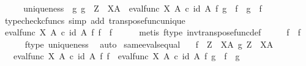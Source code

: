 \begin{isabellebody}
\ \ \isamarkupfalse%
\ \isamarkupfalse%
\ uniqueness{\isacharcolon}{\kern0pt}\ {\isachardoublequoteopen}{\isasymforall}\ g{\isachardot}{\kern0pt}\ g\ {\isacharcolon}{\kern0pt}\ Z\ {\isasymrightarrow}\ X\isactrlbsup A\isactrlesup \ {\isasymlongrightarrow}\ eval{\isacharunderscore}{\kern0pt}func\ X\ A\ {\isasymcirc}\isactrlsub c\ {\isacharparenleft}{\kern0pt}id\ A\ {\isasymtimes}\isactrlsub f\ g{\isacharparenright}{\kern0pt}\ {\isacharequal}{\kern0pt}\ f\isactrlsup {\isasymflat}\ {\isasymlongrightarrow}\ g\ {\isacharequal}{\kern0pt}\ {\isacharparenleft}{\kern0pt}f\isactrlsup {\isasymflat}{\isacharparenright}{\kern0pt}\isactrlsup {\isasymsharp}{\isachardoublequoteclose}\isanewline
\ \ \ \ \isamarkupfalse%
\ {\isacharparenleft}{\kern0pt}typecheck{\isacharunderscore}{\kern0pt}cfuncs{\isacharcomma}{\kern0pt}\ simp\ add{\isacharcolon}{\kern0pt}\ transpose{\isacharunderscore}{\kern0pt}func{\isacharunderscore}{\kern0pt}unique{\isacharparenright}{\kern0pt}\isanewline
\ \ \isamarkupfalse%
\ {\isachardoublequoteopen}eval{\isacharunderscore}{\kern0pt}func\ X\ A\ {\isasymcirc}\isactrlsub c\ {\isacharparenleft}{\kern0pt}id\ A\ {\isasymtimes}\isactrlsub f\ f{\isacharparenright}{\kern0pt}\ {\isacharequal}{\kern0pt}\ f\isactrlsup {\isasymflat}{\isachardoublequoteclose}\isanewline
\ \ \ \ \isamarkupfalse%
\ {\isacharparenleft}{\kern0pt}metis\ f{\isacharunderscore}{\kern0pt}type\ inv{\isacharunderscore}{\kern0pt}transpose{\isacharunderscore}{\kern0pt}func{\isacharunderscore}{\kern0pt}def{}{\isacharparenright}{\kern0pt}\isanewline
\ \ \isamarkupfalse%
\ \isamarkupfalse%
\ {\isachardoublequoteopen}f\isactrlsup {\isasymflat}\isactrlsup {\isasymsharp}\ {\isacharequal}{\kern0pt}\ f{\isachardoublequoteclose}\isanewline
\ \ \ \ \isamarkupfalse%
\ f{\isacharunderscore}{\kern0pt}type\ uniqueness\ \isamarkupfalse%
\ auto\isanewline
{}\isamarkupfalse%
%
\endisatagproof
{\isafoldproof}%
%
\isadelimproof
\isanewline
%
\endisadelimproof
\isanewline
{}\isamarkupfalse%
\ same{\isacharunderscore}{\kern0pt}evals{\isacharunderscore}{\kern0pt}equal{\isacharcolon}{\kern0pt}\isanewline
\ \ \ {\isachardoublequoteopen}f\ {\isacharcolon}{\kern0pt}\ Z\ {\isasymrightarrow}\ X\isactrlbsup A\isactrlesup {\isachardoublequoteclose}\ {\isachardoublequoteopen}g{\isacharcolon}{\kern0pt}\ Z\ {\isasymrightarrow}\ X\isactrlbsup A\isactrlesup {\isachardoublequoteclose}\isanewline
\ \ \ {\isachardoublequoteopen}eval{\isacharunderscore}{\kern0pt}func\ X\ A\ {\isasymcirc}\isactrlsub c\ {\isacharparenleft}{\kern0pt}id\ A\ {\isasymtimes}\isactrlsub f\ f{\isacharparenright}{\kern0pt}\ {\isacharequal}{\kern0pt}\ eval{\isacharunderscore}{\kern0pt}func\ X\ A\ {\isasymcirc}\isactrlsub c\ {\isacharparenleft}{\kern0pt}id\ A\ {\isasymtimes}\isactrlsub f\ g{\isacharparenright}{\kern0pt}\ {\isasymLongrightarrow}\ f\ {\isacharequal}{\kern0pt}\ g{\isachardoublequoteclose}\isanewline

\end{isabellebody}
